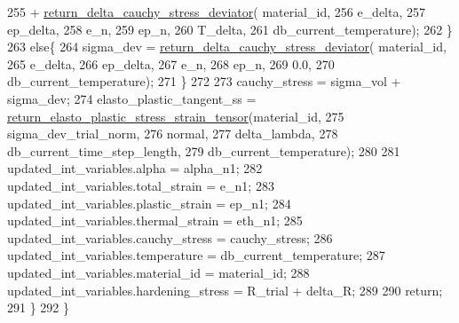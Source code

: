 \begin{DoxyCode}
255                             + \hyperlink{classConstitutive__Laws_1_1Thermo__Elasto__Plastic_af1cc15583d72208ac71ef846769744ca}{return\_delta\_cauchy\_stress\_deviator}(
      material\_id,
256                                                                   e\_delta,
257                                                                   ep\_delta,
258                                                                   e\_n,
259                                                                   ep\_n,
260                                                                   T\_delta,
261                                                                   db\_current\_temperature);
262             \}
263             \textcolor{keywordflow}{else}\{
264                 sigma\_dev = \hyperlink{classConstitutive__Laws_1_1Thermo__Elasto__Plastic_af1cc15583d72208ac71ef846769744ca}{return\_delta\_cauchy\_stress\_deviator}(
      material\_id,
265                                                                 e\_delta,
266                                                                 ep\_delta,
267                                                                 e\_n,
268                                                                 ep\_n,
269                                                                 0.0,
270                                                                 db\_current\_temperature);
271             \}
272 
273             cauchy\_stress = sigma\_vol + sigma\_dev;
274             elasto\_plastic\_tangent\_ss = 
      \hyperlink{classConstitutive__Laws_1_1Thermo__Elasto__Plastic_a3c565ecee2f2db0511877f2b20302b14}{return\_elasto\_plastic\_stress\_strain\_tensor}(material\_id,
275                                                                                    sigma\_dev\_trial\_norm,
276                                                                                    normal,
277                                                                                    delta\_lambda,
278                                                                                    
      db\_current\_time\_step\_length,
279                                                                                    db\_current\_temperature);
280 
281             updated\_int\_variables.alpha = alpha\_n1;
282             updated\_int\_variables.total\_strain = e\_n1;
283             updated\_int\_variables.plastic\_strain = ep\_n1;
284             updated\_int\_variables.thermal\_strain = eth\_n1;
285             updated\_int\_variables.cauchy\_stress = cauchy\_stress;
286             updated\_int\_variables.temperature = db\_current\_temperature;
287             updated\_int\_variables.material\_id = material\_id;
288             updated\_int\_variables.hardening\_stress = R\_trial + delta\_R;
289 
290             \textcolor{keywordflow}{return};
291         \}
292     \}
\end{DoxyCode}
